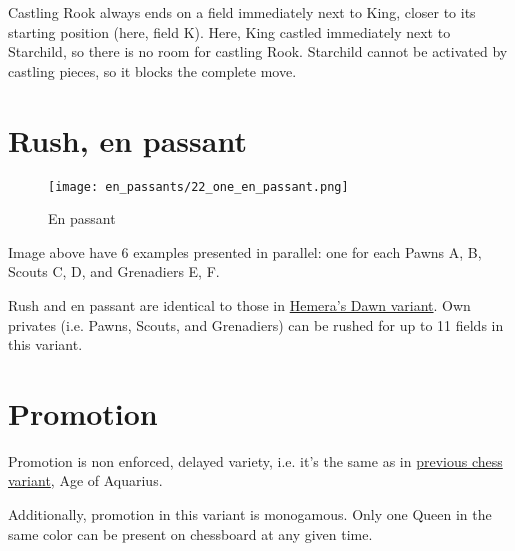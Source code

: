 \vspace*{-0.4\baselineskip}
Castling Rook always ends on a field immediately next to King, closer to its starting
position (here, field K). Here, King castled immediately next to Starchild, so there
is no room for castling Rook. Starchild cannot be activated by castling pieces, so
it blocks the complete move.

\clearpage %

\section*{Rush, en passant}
\label{sec:One/Rush, en passant}

\vspace*{-1.4\baselineskip}
\noindent
\begin{figure}[!h]
\texttt{[image: en\_passants/22\_one\_en\_passant.png]}
\vspace*{-1.3\baselineskip}
\caption{En passant}
\label{fig:22_one_en_passant}
\end{figure}

\vspace*{-0.5\baselineskip}
Image above have 6 examples presented in parallel: one for each Pawns A, B,
Scouts C, D, and Grenadiers E, F.

Rush and en passant are identical to those in
\hyperref[fig:14_hemera_s_dawn_en_passant]{Hemera's Dawn variant}.
Own privates (i.e. Pawns, Scouts, and Grenadiers) can be rushed for up to 11
fields in this variant.

\clearpage %

\section*{Promotion}
\label{sec:One/Promotion}

\vspace*{-0.3\baselineskip}
Promotion is non enforced, delayed variety, i.e. it's the same as in
\hyperref[sec:Age of Aquarius/Promotion]{previous chess variant}, Age of Aquarius.

Additionally, promotion in this variant is monogamous. Only one Queen
in the same color can be present on chessboard at any given time.

